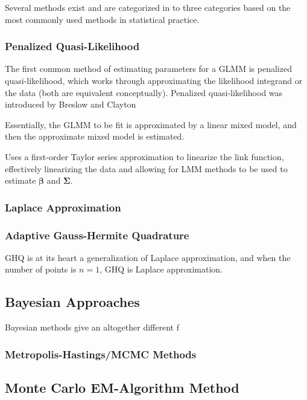 \documentclass{article}\usepackage[]{graphicx}\usepackage[]{color}
\newcommand{\mb}[1]{$\bm{#1}$}
\begin{document}
Several methods exist and are categorized in to three categories based on the most commonly used methods in statistical practice. 

\subsubsection{Penalized Quasi-Likelihood}

The first common method of estimating parameters for a GLMM is penalized quasi-likelihood, which works through approximating the likelihood integrand or the data (both are equivalent conceptually). Penalized quasi-likelihood was introduced by Breslow and Clayton 

Essentially, the GLMM to be fit is approximated by a linear mixed model, and then the approximate mixed model is estimated.

Uses a first-order Taylor series approximation to linearize the link function, effectively linearizing the data and allowing for LMM methods to be used to estimate \mb{\beta} and \mb{\Sigma}. 

\subsubsection{Laplace Approximation}



\subsubsection{Adaptive Gauss-Hermite Quadrature}

GHQ is at its heart a generalization of Laplace approximation, and when the number of points is $n=1$, GHQ is Laplace approximation. 

\subsection{Bayesian Approaches}

Bayesian methods give an altogether different f

\subsubsection{Metropolis-Hastings/MCMC Methods}



\subsection{Monte Carlo EM-Algorithm Method}
\end{document}
